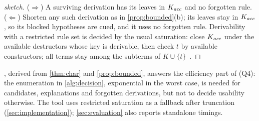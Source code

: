 \begin{proof}[sketch]
($\Rightarrow$) A surviving derivation has its leaves in $K_{\mathit{acc}}$ and no forgotten rule. ($\Leftarrow$) Shorten any such derivation as in \cref{prop:bounded}(b); its leaves stay in $K_{\mathit{acc}}$, so its blocked hypotheses are cued, and it uses no forgotten rule. Derivability with a restricted rule set is decided by the usual saturation: close $K_{\mathit{acc}}$ under the available destructors whose key is derivable, then check $t$ by available constructors; all terms stay among the subterms of $K\cup\{t\}$~\cite{rusinowitch2003protocol}.
\end{proof}

, derived from \cref{thm:char} and \cref{prop:bounded}, answers the efficiency part of (Q4): the enumeration in \cref{alg:decision}, exponential in the worst case, is needed for candidates, explanations and forgotten derivations, but not to decide usability otherwise. The tool uses restricted saturation as a fallback after truncation (\cref{sec:implementation}); \cref{sec:evaluation} also reports standalone timings.
